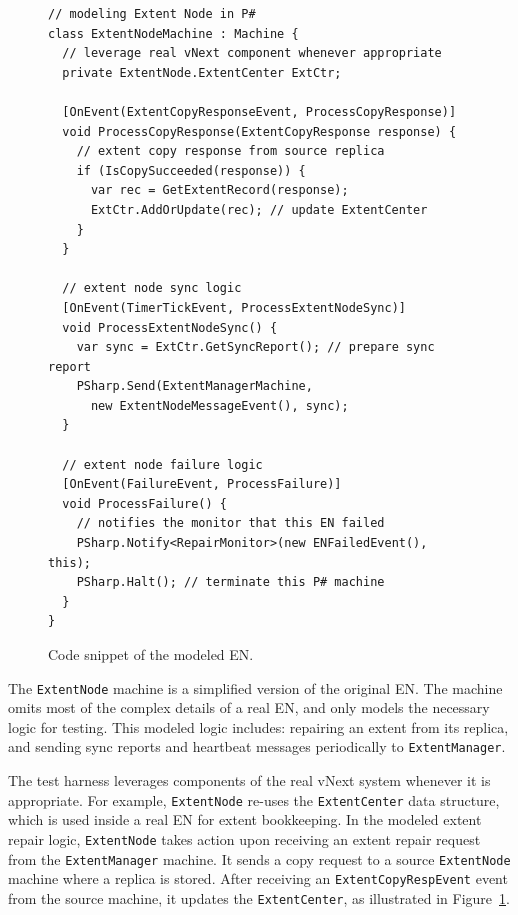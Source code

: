 \begin{figure}[t]
\begin{lstlisting}
// modeling Extent Node in P#
class ExtentNodeMachine : Machine {
  // leverage real vNext component whenever appropriate
  private ExtentNode.ExtentCenter ExtCtr;

  [OnEvent(ExtentCopyResponseEvent, ProcessCopyResponse)]
  void ProcessCopyResponse(ExtentCopyResponse response) {
    // extent copy response from source replica
    if (IsCopySucceeded(response)) {
      var rec = GetExtentRecord(response);
      ExtCtr.AddOrUpdate(rec); // update ExtentCenter
    }
  }

  // extent node sync logic
  [OnEvent(TimerTickEvent, ProcessExtentNodeSync)]
  void ProcessExtentNodeSync() {
    var sync = ExtCtr.GetSyncReport(); // prepare sync report
    PSharp.Send(ExtentManagerMachine, 
      new ExtentNodeMessageEvent(), sync);
  }
  
  // extent node failure logic
  [OnEvent(FailureEvent, ProcessFailure)]
  void ProcessFailure() {
    // notifies the monitor that this EN failed
    PSharp.Notify<RepairMonitor>(new ENFailedEvent(), this);
    PSharp.Halt(); // terminate this P# machine
  }
}
\end{lstlisting}
\vspace{-5mm}
\caption{Code snippet of the modeled EN.}
\label{fig:modeled_en}
\vspace{-4mm}
\end{figure}

The \texttt{ExtentNode} machine is a simplified version of the original EN. The machine omits most of the complex details of a real EN, and only models the necessary logic for testing. This modeled logic includes: repairing an extent from its replica, and sending sync reports and heartbeat messages periodically to \texttt{ExtentManager}. 

The \psharp test harness leverages components of the real vNext system whenever it is appropriate. For example, \texttt{ExtentNode} re-uses the \texttt{ExtentCenter} data structure, which is used inside a real EN for extent bookkeeping. In the modeled extent repair logic, \texttt{ExtentNode} takes action upon receiving an extent repair request from the \texttt{ExtentManager} machine. It sends a copy request to a source \texttt{ExtentNode} machine where a replica is stored. After receiving an \texttt{ExtentCopyRespEvent} event from the source machine, it updates the \texttt{ExtentCenter}, as illustrated in Figure~\ref{fig:modeled_en}. 

